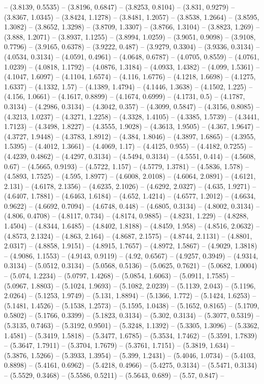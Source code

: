 -- (3.8139, 0.5535) -- (3.8196, 0.6847) -- (3.8253, 0.8104) -- (3.831, 0.9279) -- (3.8367, 1.0345) -- (3.8424, 1.1278) -- (3.8481, 1.2057) -- (3.8538, 1.2664) -- (3.8595, 1.3082) -- (3.8652, 1.3298) -- (3.8709, 1.3307) -- (3.8766, 1.3104) -- (3.8823, 1.269) -- (3.888, 1.2071) -- (3.8937, 1.1255) -- (3.8994, 1.0259) -- (3.9051, 0.9098) -- (3.9108, 0.7796) -- (3.9165, 0.6378) -- (3.9222, 0.487) -- (3.9279, 0.3304) -- (3.9336, 0.3134) -- (4.0534, 0.3134) -- (4.0591, 0.4961) -- (4.0648, 0.6787) -- (4.0705, 0.8559) -- (4.0761, 1.0239) -- (4.0818, 1.1792) -- (4.0876, 1.3184) -- (4.0933, 1.4382) -- (4.099, 1.5361) -- (4.1047, 1.6097) -- (4.1104, 1.6574) -- (4.116, 1.6776) -- (4.1218, 1.6698) -- (4.1275, 1.6337) -- (4.1332, 1.57) -- (4.1389, 1.4794) -- (4.1446, 1.3638) -- (4.1502, 1.225) -- (4.156, 1.0661) -- (4.1617, 0.8899) -- (4.1674, 0.6999) -- (4.1731, 0.5) -- (4.1787, 0.3134) -- (4.2986, 0.3134) -- (4.3042, 0.357) -- (4.3099, 0.5847) -- (4.3156, 0.8085) -- (4.3213, 1.0237) -- (4.3271, 1.2258) -- (4.3328, 1.4105) -- (4.3385, 1.5739) -- (4.3441, 1.7123) -- (4.3498, 1.8227) -- (4.3555, 1.9028) -- (4.3613, 1.9505) -- (4.367, 1.9647) -- (4.3727, 1.9448) -- (4.3783, 1.8912) -- (4.384, 1.8046) -- (4.3897, 1.6865) -- (4.3955, 1.5395) -- (4.4012, 1.3661) -- (4.4069, 1.17) -- (4.4125, 0.955) -- (4.4182, 0.7255) -- (4.4239, 0.4862) -- (4.4297, 0.3134) -- (4.5494, 0.3134) -- (4.5551, 0.414) -- (4.5608, 0.67) -- (4.5665, 0.9193) -- (4.5722, 1.157) -- (4.5779, 1.3781) -- (4.5836, 1.578) -- (4.5893, 1.7525) -- (4.595, 1.8977) -- (4.6008, 2.0108) -- (4.6064, 2.0891) -- (4.6121, 2.131) -- (4.6178, 2.1356) -- (4.6235, 2.1026) -- (4.6292, 2.0327) -- (4.635, 1.9271) -- (4.6407, 1.7881) -- (4.6463, 1.6184) -- (4.652, 1.4214) -- (4.6577, 1.2012) -- (4.6634, 0.9622) -- (4.6692, 0.7094) -- (4.6748, 0.448) -- (4.6805, 0.3134) -- (4.8002, 0.3134) -- (4.806, 0.4708) -- (4.8117, 0.734) -- (4.8174, 0.9885) -- (4.8231, 1.229) -- (4.8288, 1.4504) -- (4.8344, 1.6485) -- (4.8402, 1.8188) -- (4.8459, 1.958) -- (4.8516, 2.0632) -- (4.8573, 2.1324) -- (4.863, 2.164) -- (4.8687, 2.1575) -- (4.8744, 2.1131) -- (4.8801, 2.0317) -- (4.8858, 1.9151) -- (4.8915, 1.7657) -- (4.8972, 1.5867) -- (4.9029, 1.3818) -- (4.9086, 1.1553) -- (4.9143, 0.9119) -- (4.92, 0.6567) -- (4.9257, 0.3949) -- (4.9314, 0.3134) -- (5.0512, 0.3134) -- (5.0568, 0.5136) -- (5.0625, 0.7621) -- (5.0682, 1.0004) -- (5.074, 1.2234) -- (5.0797, 1.4268) -- (5.0854, 1.6063) -- (5.0911, 1.7585) -- (5.0967, 1.8803) -- (5.1024, 1.9693) -- (5.1082, 2.0239) -- (5.1139, 2.043) -- (5.1196, 2.0264) -- (5.1253, 1.9749) -- (5.131, 1.8894) -- (5.1366, 1.772) -- (5.1424, 1.6253) -- (5.1481, 1.4526) -- (5.1538, 1.2573) -- (5.1595, 1.0438) -- (5.1652, 0.8165) -- (5.1709, 0.5802) -- (5.1766, 0.3399) -- (5.1823, 0.3134) -- (5.302, 0.3134) -- (5.3077, 0.5319) -- (5.3135, 0.7463) -- (5.3192, 0.9501) -- (5.3248, 1.1392) -- (5.3305, 1.3096) -- (5.3362, 1.4581) -- (5.3419, 1.5818) -- (5.3477, 1.6785) -- (5.3534, 1.7462) -- (5.3591, 1.7839) -- (5.3647, 1.7911) -- (5.3704, 1.7679) -- (5.3761, 1.7151) -- (5.3819, 1.634) -- (5.3876, 1.5266) -- (5.3933, 1.3954) -- (5.399, 1.2431) -- (5.4046, 1.0734) -- (5.4103, 0.8898) -- (5.4161, 0.6962) -- (5.4218, 0.4966) -- (5.4275, 0.3134) -- (5.5471, 0.3134) -- (5.5529, 0.3468) -- (5.5586, 0.5211) -- (5.5643, 0.689) -- (5.57, 0.847) -- 